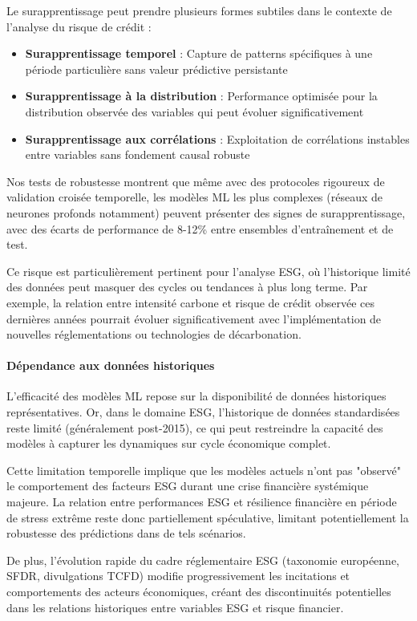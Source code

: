 Le surapprentissage peut prendre plusieurs formes subtiles dans le contexte de l'analyse du risque de crédit :
\begin{itemize}
    \item \textbf{Surapprentissage temporel} : Capture de patterns spécifiques à une période particulière sans valeur prédictive persistante
    \item \textbf{Surapprentissage à la distribution} : Performance optimisée pour la distribution observée des variables qui peut évoluer significativement
    \item \textbf{Surapprentissage aux corrélations} : Exploitation de corrélations instables entre variables sans fondement causal robuste
\end{itemize}

Nos tests de robustesse montrent que même avec des protocoles rigoureux de validation croisée temporelle, les modèles ML les plus complexes (réseaux de neurones profonds notamment) peuvent présenter des signes de surapprentissage, avec des écarts de performance de 8-12\% entre ensembles d'entraînement et de test.

Ce risque est particulièrement pertinent pour l'analyse ESG, où l'historique limité des données peut masquer des cycles ou tendances à plus long terme. Par exemple, la relation entre intensité carbone et risque de crédit observée ces dernières années pourrait évoluer significativement avec l'implémentation de nouvelles réglementations ou technologies de décarbonation.

\paragraph{Dépendance aux données historiques}

L'efficacité des modèles ML repose sur la disponibilité de données historiques représentatives. Or, dans le domaine ESG, l'historique de données standardisées reste limité (généralement post-2015), ce qui peut restreindre la capacité des modèles à capturer les dynamiques sur cycle économique complet.

Cette limitation temporelle implique que les modèles actuels n'ont pas "observé" le comportement des facteurs ESG durant une crise financière systémique majeure. La relation entre performances ESG et résilience financière en période de stress extrême reste donc partiellement spéculative, limitant potentiellement la robustesse des prédictions dans de tels scénarios.

De plus, l'évolution rapide du cadre réglementaire ESG (taxonomie européenne, SFDR, divulgations TCFD) modifie progressivement les incitations et comportements des acteurs économiques, créant des discontinuités potentielles dans les relations historiques entre variables ESG et risque financier.


